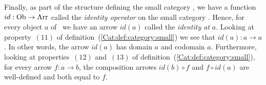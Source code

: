Finally, as part of the structure defining the small category \Cat, we have
a function $id:\mbox{\rm Ob}\to\mbox{\rm Arr}$ called the {\em identity operator} on the small
category \Cat. Hence, for every object $a$ of \Cat\ we have an arrow 
$id(a)$ called the {\em identity at} $a$. Looking at property~$(11)$ of 
definition~(\ref{Cat:def:category:small}) we see that $id(a):a\to a$. 
In other words, the arrow $id(a)$ has domain $a$ and codomain $a$. 
Furthermore, looking at properties~$(12)$ and~$(13)$ of 
definition~(\ref{Cat:def:category:small}), for every arrow $f:a\to b$, the
composition arrows $id(b)\circ f$ and $f\circ id(a)$ are well-defined and both
equal to $f$.


